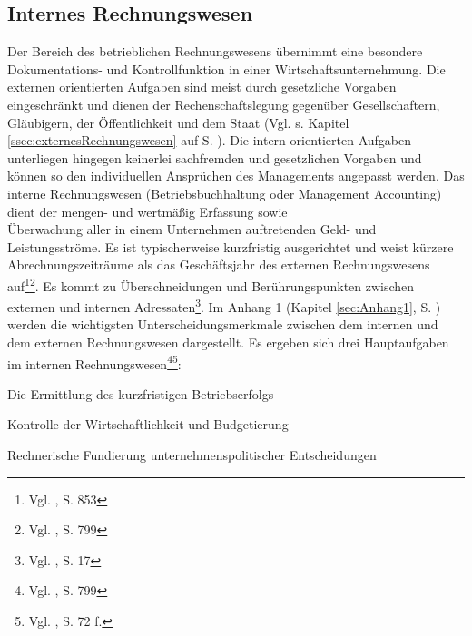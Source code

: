 \subsection{Internes Rechnungswesen}
\label{ssec:internesRechnungswesen}

Der Bereich des betrieblichen Rechnungswesens übernimmt eine besondere Dokumentations- und Kontrollfunktion in einer Wirtschaftsunternehmung.
Die externen orientierten Aufgaben sind meist durch gesetzliche Vorgaben eingeschränkt und dienen der Rechenschaftslegung gegenüber Gesellschaftern, Gläubigern, der Öffentlichkeit und dem Staat (Vgl. s. Kapitel \ref{ssec:externesRechnungswesen} auf S. \pageref{ssec:externesRechnungswesen}).
Die intern orientierten Aufgaben unterliegen hingegen keinerlei sachfremden und gesetzlichen Vorgaben und können so den individuellen Ansprüchen des Managements angepasst werden. Das interne Rechnungswesen (Betriebsbuchhaltung oder Management Accounting) dient der mengen- und wertmäßig Erfassung sowie\\ Überwachung aller in einem Unternehmen auftretenden Geld- und Leistungsströme. Es ist typischerweise kurzfristig ausgerichtet und weist kürzere Abrechnungszeiträume als das Geschäftsjahr des externen Rechnungswesens auf\footnote{Vgl. \cite{Wohe2000}, S. 853}\footnote{Vgl. \cite{Schierenbeck2008}, S. 799}. Es kommt zu Überschneidungen 
und Berührungspunkten zwischen externen und internen Adressaten\footnote{Vgl. \cite{Muller2006}, S. 17}.
Im Anhang 1 (Kapitel \ref{sec:Anhang1}, S. \pageref{sec:Anhang1}) werden die wichtigsten Unterscheidungsmerkmale zwischen dem internen und dem externen Rechnungswesen dargestellt.
\noindent Es ergeben sich drei Hauptaufgaben im internen Rechnungswesen\footnote{Vgl. \cite{Schierenbeck2008}, S. 799}\footnote{Vgl. \cite{Baetge2008}, S. 72 f.}:
\begin{compactitem}
\item[1.] Die Ermittlung des kurzfristigen Betriebserfolgs
\item[2.] Kontrolle der Wirtschaftlichkeit und Budgetierung
\item[3.] Rechnerische Fundierung unternehmenspolitischer Entscheidungen
\end{compactitem}
